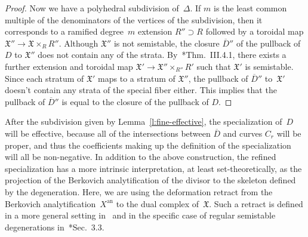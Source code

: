 \documentclass[11pt]{amsart}
\theoremstyle{definition}
\newcommand{\X}{\mathfrak X}
\begin{document}
\begin{proof}
Now we have a polyhedral subdivision of~$\Delta$.
If $m$ is the least common multiple of the denominators of the vertices of the
subdivision, then it corresponds to a ramified degree~$m$ extension $R'' \supset
R$ followed by a toroidal map $\X'' \rightarrow \X \times_R R''$. Although
$\X''$ is not semistable, the closure $\overline D''$ of the pullback of $D$ to
$\X''$ does not contain any of the strata. By~\cite{kkmsd}*{Thm.~III.4.1}, there
exists a further extension and toroidal map $\X' \rightarrow \X'' \times_{R''}
R'$ such that $\X'$ is semistable. Since each stratum of $\X'$ maps to a stratum
of $\X''$, the pullback of $\overline D''$ to~$\X'$ doesn't contain any strata
of the special fiber either. This implies that the pullback of $\overline D''$
is equal to the closure of the pullback of $D$.
\end{proof}

After the subdivision given by Lemma~\ref{l:fine-effective}, the
specialization of~$D$ will be effective, because all of the intersections
between $\overline D$ and curves $C_r$ will be proper, and thus the coefficients
making up the definition of the specialization will all be non-negative. In
addition to the above  construction, the refined specialization has a more
intrinsic interpretation, at least set-theoretically, as the projection of the
Berkovich analytification of the divisor to the skeleton defined by the
degeneration. Here, we are using the deformation retract from the Berkovich
analytification~$X^{\operatorname{an}}$ to the dual complex of~$\X$. Such
a retract is defined in a more general setting in~\cite{berkovich2} and in the
specific case of regular semistable degenerations in~\cite{nicaise}*{Sec.~3.3}.
\end{document}
